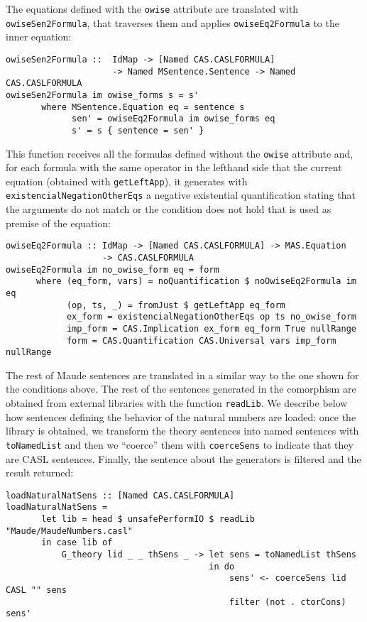 The equations defined with the \verb"owise" attribute are translated
with \verb"owiseSen2Formula", that traverses them and applies
\verb"owiseEq2Formula" to the inner equation:

{\codesize
\begin{verbatim}
owiseSen2Formula ::  IdMap -> [Named CAS.CASLFORMULA] 
                     -> Named MSentence.Sentence -> Named CAS.CASLFORMULA
owiseSen2Formula im owise_forms s = s'
       where MSentence.Equation eq = sentence s
             sen' = owiseEq2Formula im owise_forms eq
             s' = s { sentence = sen' }
\end{verbatim}
}

This function receives all the formulas defined without the \verb"owise"
attribute and, for each formula with the same operator in the lefthand
side that the current equation (obtained with \verb"getLeftApp"), it
generates with \verb"existencialNegationOtherEqs" a negative existential
quantification stating that the arguments do not match or the condition
does not hold that is used as premise of the equation:

{\codesize
\begin{verbatim}
owiseEq2Formula :: IdMap -> [Named CAS.CASLFORMULA] -> MAS.Equation
                   -> CAS.CASLFORMULA
owiseEq2Formula im no_owise_form eq = form
      where (eq_form, vars) = noQuantification $ noOwiseEq2Formula im eq
            (op, ts, _) = fromJust $ getLeftApp eq_form
            ex_form = existencialNegationOtherEqs op ts no_owise_form
            imp_form = CAS.Implication ex_form eq_form True nullRange
            form = CAS.Quantification CAS.Universal vars imp_form nullRange
\end{verbatim}
}

The rest of Maude sentences are translated in a similar way to the one
shown for the conditions above.
The rest of the sentences generated in the comorphism are obtained
from external libraries with the function \verb"readLib". We describe
below how sentences defining the behavior of the natural numbers are
loaded: once the library is obtained, we transform the theory sentences
into named sentences with \verb"toNamedList" and then we ``coerce''
them with \verb"coerceSens" to indicate that they are CASL sentences.
Finally, the sentence about the generators is filtered and the result
returned:

{\codesize
\begin{verbatim}
loadNaturalNatSens :: [Named CAS.CASLFORMULA]
loadNaturalNatSens = 
       let lib = head $ unsafePerformIO $ readLib "Maude/MaudeNumbers.casl"
       in case lib of
           G_theory lid _ _ thSens _ -> let sens = toNamedList thSens
                                        in do
                                            sens' <- coerceSens lid CASL "" sens
                                            filter (not . ctorCons) sens'
\end{verbatim}
}

